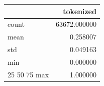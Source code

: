 \begin{tabular}{lr}
\toprule
 & tokenized \\
\midrule
count & 63672.000000 \\
mean & 0.258007 \\
std & 0.049163 \\
min & 0.000000 \\
25%
50%
75%
max & 1.000000 \\
\bottomrule
\end{tabular}
